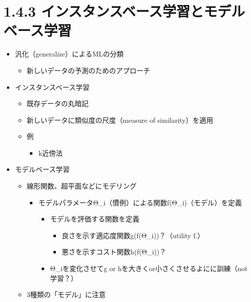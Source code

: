 \hypertarget{ux30a4ux30f3ux30b9ux30bfux30f3ux30b9ux30d9ux30fcux30b9ux5b66ux7fd2ux3068ux30e2ux30c7ux30ebux30d9ux30fcux30b9ux5b66ux7fd2}{%
\section{1.4.3
インスタンスベース学習とモデルベース学習}\label{ux30a4ux30f3ux30b9ux30bfux30f3ux30b9ux30d9ux30fcux30b9ux5b66ux7fd2ux3068ux30e2ux30c7ux30ebux30d9ux30fcux30b9ux5b66ux7fd2}}

\begin{itemize}
\tightlist
\item
  汎化（generalize）によるMLの分類

  \begin{itemize}
  \tightlist
  \item
    新しいデータの予測のためのアプローチ
  \end{itemize}
\item
  インスタンスベース学習

  \begin{itemize}
  \tightlist
  \item
    既存データの丸暗記
  \item
    新しいデータに類似度の尺度（measure of similarity）を適用
  \item
    例

    \begin{itemize}
    \tightlist
    \item
      k近傍法
    \end{itemize}
  \end{itemize}
\item
  モデルベース学習

  \begin{itemize}
  \tightlist
  \item
    線形関数、超平面などにモデリング

    \begin{itemize}
    \tightlist
    \item
      モデルパラメータΘ\_i（慣例）による関数f(Θ\_i)（モデル）を定義

      \begin{itemize}
      \tightlist
      \item
        モデルを評価する関数を定義

        \begin{itemize}
        \tightlist
        \item
          良さを示す適応度関数g(f(Θ\_i))？（utility f.）
        \item
          悪さを示すコスト関数h(f(Θ\_i))？
        \end{itemize}
      \item
        Θ\_iを変化させてg or hを大きくor小さくさせるよにに訓練（not
        学習？）
      \end{itemize}
    \end{itemize}
  \item
    3種類の「モデル」に注意


\end{itemize}
\end{itemize}
